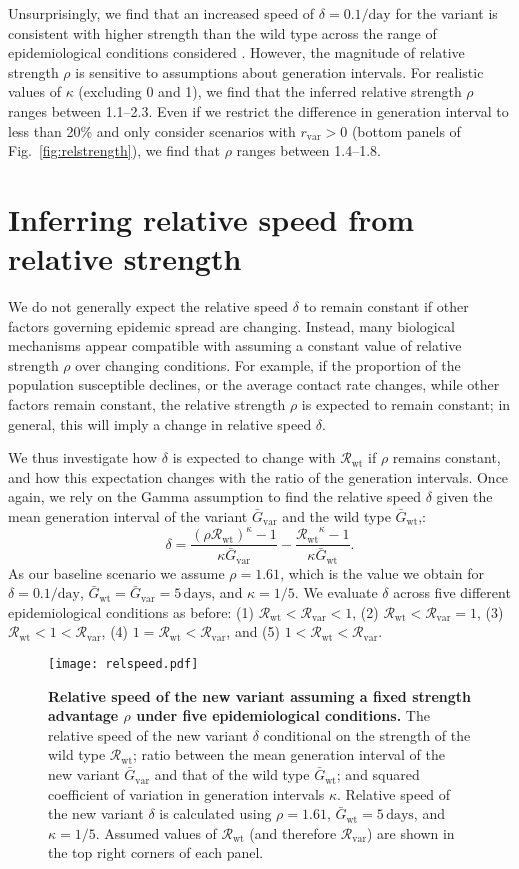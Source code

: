 \documentclass[12pt]{article}
\newcommand{\fref}[1]{Fig.~\ref{fig:#1}}
\newcommand{\vvvar}{\mathrm{var}}
\newcommand{\wwwt}{\mathrm{wt}}
\newcommand{\rx}[1]{\ensuremath{{r}_{#1}}\xspace}
\newcommand{\rv}{\rx{\vvvar}}
\newcommand{\Rx}[1]{\ensuremath{{\mathcal R}_{#1}}\xspace}
\newcommand{\Rw}{\Rx{\wwwt}}
\newcommand{\Rv}{\Rx{\vvvar}}
\newcommand{\days}{\ensuremath{\, \textrm{days}}}
\newcommand{\pday}{\ensuremath{/\textrm{day}}}
\newcommand{\Gx}[1]{\ensuremath{{\bar G}_{#1}}\xspace}
\newcommand{\Gw}{\Gx{\wwwt}}
\newcommand{\Gv}{\Gx{\vvvar}}
\begin{document}
Unsurprisingly, we find that an increased speed of $\delta=0.1\pday$ for the variant is consistent with higher strength than the wild type across the range of epidemiological conditions considered \citep{switzerland2021variant, davies2021estimated, di2021impact, leung2021early, volz2021transmission,zhao2021}.
However, the magnitude of relative strength $\rho$ is sensitive to assumptions about generation intervals.
For realistic values of $\kappa$ (excluding 0 and 1), we find that the inferred relative strength $\rho$ ranges between 1.1--2.3.
Even if we restrict the difference in generation interval to less than 20\% and only consider scenarios with $\rv>0$ (bottom panels of \fref{relstrength}), we find that $\rho$ ranges between 1.4--1.8.

\section{Inferring relative speed from relative strength}

We do not generally expect the relative speed $\delta$ to remain constant if other factors governing epidemic spread are changing.
Instead, many biological mechanisms appear compatible with assuming a constant value of relative strength $\rho$ over changing conditions.
For example, if the proportion of the population susceptible declines, or the average contact rate changes, while other factors remain constant, the relative strength $\rho$ is expected to remain constant; 
in general, this will imply a change in relative speed $\delta$.

We thus investigate how $\delta$ is expected to change with \Rw if $\rho$ remains constant, and how this expectation changes with the ratio of the generation intervals. 
Once again, we rely on the Gamma assumption to find the relative speed $\delta$ given the mean generation interval of the variant $\Gv$ and the wild type $\Gw$,:
\begin{equation}
\delta = \frac{(\rho \Rw)^{\kappa} - 1}{\kappa \Gv} - \frac{\Rw^{\kappa} - 1}{\kappa \Gw}.
\end{equation}
As our baseline scenario we assume $\rho = 1.61$, which is the value we obtain for $\delta=0.1\pday$, $\Gw = \Gv = 5\,\textrm{days}$, and $\kappa = 1/5$.
We evaluate $\delta$ across five different epidemiological conditions as before: (1) $\Rw < \Rv < 1$, (2) $\Rw < \Rv = 1$, (3) $\Rw < 1 < \Rv$, (4) $1 = \Rw < \Rv$, and (5) $1 < \Rw < \Rv$.

\begin{figure}[!th]
\texttt{[image: relspeed.pdf]}
\caption{
\textbf{Relative speed of the new variant assuming a fixed strength advantage $\rho$ under five epidemiological conditions.}
The relative speed of the new variant $\delta$ conditional on the strength of the wild type $\Rw$; ratio between the mean generation interval of the new variant $\Gv$ and that of the wild type $\Gw$; and squared coefficient of variation in generation intervals $\kappa$.
Relative speed of the new variant $\delta$ is calculated using $\rho=1.61$, $\Gw = 5\days$, and $\kappa = 1/5$.
Assumed values of $\Rw$ (and therefore $\Rv$) are shown in the top right corners of each panel.
}
\label{fig:relspeed}
\end{figure}
\end{document}
